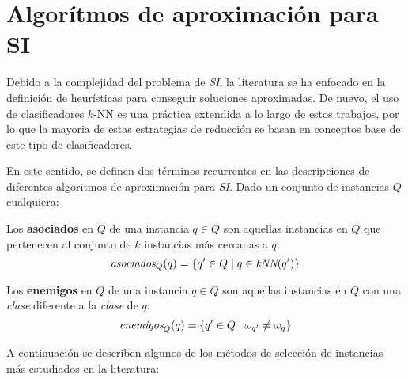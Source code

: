 \section{Algorítmos de aproximación para SI}

Debido a la complejidad del problema de \emph{SI}, la literatura se ha enfocado en la definición de heurísticas para conseguir soluciones aproximadas. De nuevo, el uso de clasificadores $k$-NN es una práctica extendida a lo largo de estos trabajos, por lo que la mayoria de estas estrategias de reducción se basan en conceptos base de este tipo de clasificadores.

En este sentido, se definen dos términos recurrentes en las descripciones de diferentes algoritmos de aproximación para \emph{SI}. Dado un conjunto de instancias $Q$ cualquiera:

\begin{definicion}
Los \textbf{asociados} en $Q$ de una instancia $q \in Q$ son aquellas instancias en $Q$ que pertenecen al conjunto de $k$ instancias más cercanas a $q$:
\begin{equation}
\emph{asociados}_Q(q) = \left\lbrace q' \in Q \mid q\in \emph{kNN}(q') \right\rbrace
\end{equation}
\end{definicion}

\begin{definicion}
Los \textbf{enemigos} en $Q$ de una instancia $q \in Q$ son aquellas instancias en $Q$ con una \emph{clase} diferente a la \emph{clase} de $q$:
\begin{equation}
\emph{enemigos}_Q(q) = \left\lbrace q' \in Q \mid \omega_{q'} \neq \omega_{q} \right\rbrace
\end{equation}
\end{definicion}

A continuación se describen algunos de los métodos de selección de instancias más estudiados en la literatura:

